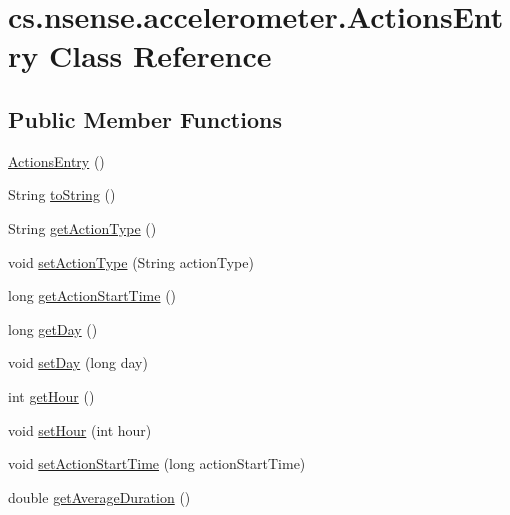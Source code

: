 \hypertarget{classcs_1_1nsense_1_1accelerometer_1_1_actions_entry}{\section{cs.\-nsense.\-accelerometer.\-Actions\-Entry Class Reference}
\label{classcs_1_1nsense_1_1accelerometer_1_1_actions_entry}
}
\subsection*{Public Member Functions}
\begin{DoxyCompactItemize}
\item 
\hyperlink{classcs_1_1nsense_1_1accelerometer_1_1_actions_entry_a84d6c7af688752892393ed477705202c}{Actions\-Entry} ()
\item 
String \hyperlink{classcs_1_1nsense_1_1accelerometer_1_1_actions_entry_af37fc2f0a064b229a9315f77943744c1}{to\-String} ()
\item 
String \hyperlink{classcs_1_1nsense_1_1accelerometer_1_1_actions_entry_a79e3ff2720aee7acb986eea0c143351a}{get\-Action\-Type} ()
\item 
void \hyperlink{classcs_1_1nsense_1_1accelerometer_1_1_actions_entry_a542c2ab9bbfe94e036678e014093565b}{set\-Action\-Type} (String action\-Type)
\item 
long \hyperlink{classcs_1_1nsense_1_1accelerometer_1_1_actions_entry_af857e1713217c0eba9a59c1970400691}{get\-Action\-Start\-Time} ()
\item 
long \hyperlink{classcs_1_1nsense_1_1accelerometer_1_1_actions_entry_a2d2020b029377e73cb4879abee3e51a6}{get\-Day} ()
\item 
void \hyperlink{classcs_1_1nsense_1_1accelerometer_1_1_actions_entry_ac624c7cd4a9e1404304306a78c387c41}{set\-Day} (long day)
\item 
int \hyperlink{classcs_1_1nsense_1_1accelerometer_1_1_actions_entry_af1e3a9c6a2b6481acaa066ef6fb15d88}{get\-Hour} ()
\item 
void \hyperlink{classcs_1_1nsense_1_1accelerometer_1_1_actions_entry_a102ac1e6b715d33ac71c38fee087cc59}{set\-Hour} (int hour)
\item 
void \hyperlink{classcs_1_1nsense_1_1accelerometer_1_1_actions_entry_ac195b1d249375bd38523645ff35a0031}{set\-Action\-Start\-Time} (long action\-Start\-Time)
\item 
double \hyperlink{classcs_1_1nsense_1_1accelerometer_1_1_actions_entry_a771e220be8a579268fd4f0e70ec2aad6}{get\-Average\-Duration} ()

\end{DoxyCompactItemize}
